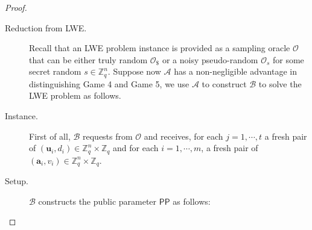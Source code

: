 \documentclass[runningheads,10pt]{llncs}
\def\ZZ{\mathbb{Z}}
\def\cal{\mathcal}
\def\bf{\mathbf}
\def\PP{\mathsf{PP}}
\begin{document}
\begin{proof}
\begin{description}
		\item[Reduction from LWE.] Recall that an LWE problem instance is provided as a sampling oracle $\cal{O}$ that can be either truly random $\cal{O}_\$$ or a noisy pseudo-random $\cal{O}_s$ for some secret random $s\in\ZZ_q^n$. Suppose now $\cal{A}$ has a non-negligible advantage in distinguishing Game 4 and Game 5, we use $\cal{A}$ to construct $\cal{B}$ to solve the LWE problem as follows.
		
		\item[Instance.] First of all, $\cal{B}$ requests from $\cal{O}$ and receives, for each $j=1,\cdots, t$ a fresh pair of $(\bf{u}_i,d_i)\in\ZZ_q^n\times\ZZ_q$ and for each $i=1,\cdots,m$, a fresh pair of $(\bf{a}_i,v_i)\in\ZZ_q^n\times\ZZ_q$.
		\item[Setup.] $\cal{B}$ constructs the public parameter $\PP$ as follows:
		

\end{description}
\end{proof}
\end{document}
